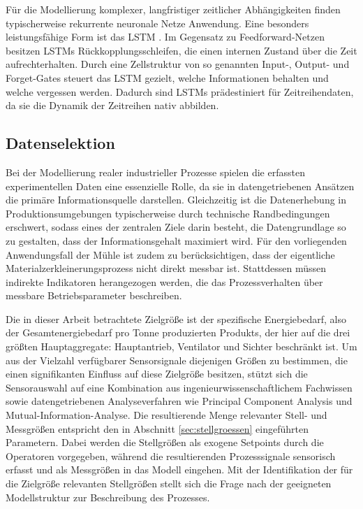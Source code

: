 Für die Modellierung komplexer, langfristiger zeitlicher Abhängigkeiten finden typischerweise rekurrente neuronale Netze Anwendung. Eine besonders leistungsfähige Form ist das \ac{LSTM} \cite{hochreiter.1997}. Im Gegensatz zu Feedforward-Netzen besitzen \ac{LSTM}s Rückkopplungsschleifen, die einen internen Zustand über die Zeit aufrechterhalten. Durch eine Zellstruktur von so genannten Input-, Output- und Forget-Gates steuert das \ac{LSTM} gezielt, welche Informationen behalten und welche vergessen werden. Dadurch sind \ac{LSTM}s prädestiniert für Zeitreihendaten, da sie die Dynamik der Zeitreihen nativ abbilden.
%
\subsection{Datenselektion} \label{sec:datenselektion}
Bei der Modellierung realer industrieller Prozesse spielen die erfassten experimentellen Daten eine essenzielle Rolle, da sie in datengetriebenen Ansätzen die primäre Informationsquelle darstellen. Gleichzeitig ist die Datenerhebung in Produktionsumgebungen typischerweise durch technische Randbedingungen erschwert, sodass eines der zentralen Ziele darin besteht, die Datengrundlage so zu gestalten, dass der Informationsgehalt maximiert wird. Für den vorliegenden Anwendungsfall der Mühle ist zudem zu berücksichtigen, dass der eigentliche Materialzerkleinerungsprozess nicht direkt messbar ist. Stattdessen müssen indirekte Indikatoren herangezogen werden, die das Prozessverhalten über messbare Betriebsparameter beschreiben. \par
Die in dieser Arbeit betrachtete Zielgröße ist der spezifische Energiebedarf, also der Gesamtenergiebedarf pro Tonne produzierten Produkts, der hier auf die drei größten Hauptaggregate: Hauptantrieb, Ventilator und Sichter beschränkt ist. Um aus der Vielzahl verfügbarer Sensorsignale diejenigen Größen zu bestimmen, die einen signifikanten Einfluss auf diese Zielgröße besitzen, stützt sich die Sensorauswahl auf eine Kombination aus ingenieurwissenschaftlichem Fachwissen sowie datengetriebenen Analyseverfahren wie Principal Component Analysis und Mutual-Information-Analyse. Die resultierende Menge relevanter Stell- und Messgrößen entspricht den in Abschnitt \ref{sec:stellgroessen} eingeführten Parametern. Dabei werden die Stellgrößen als exogene Setpoints durch die Operatoren vorgegeben, während die resultierenden Prozesssignale sensorisch erfasst und als Messgrößen in das Modell eingehen. Mit der Identifikation der für die Zielgröße relevanten Stellgrößen stellt sich die Frage nach der geeigneten Modellstruktur zur Beschreibung des Prozesses.\par
